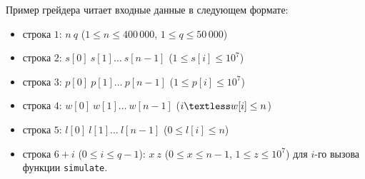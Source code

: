 \newcommand{\gt}{\textgreater} 
\newcommand{\lt}{\textless} 


Пример грейдера читает входные данные в следующем формате:
\begin{itemize}
\item строка $1$: $n\ q$ ($1 \leq n \leq 400\,000$, $1 \leq q \leq 50\,000$)
\item строка $2$: $s[0]\ s[1]\ldots \ s[n-1]$ ($1 \leq s[i] \leq 10^{7}$)
\item строка $3$: $p[0]\ p[1]\ldots \ p[n-1]$ ($1 \leq p[i] \leq 10^{7}$)
\item строка $4$: $w[0]\ w[1]\ldots \ w[n-1]$ ($i \lt w[i] \leq n$)
\item строка $5$: $l[0]\ l[1]\ldots \ l[n-1]$ ($0 \leq l[i] \leq n$)
\item строка $6 + i$ ($0 \leq i \leq q - 1$): $x\ z$ ($0 \leq x \leq n-1$, $1 \leq z \leq 10^{7}$) для $i$-го вызова функции \texttt{simulate}.
\end{itemize}